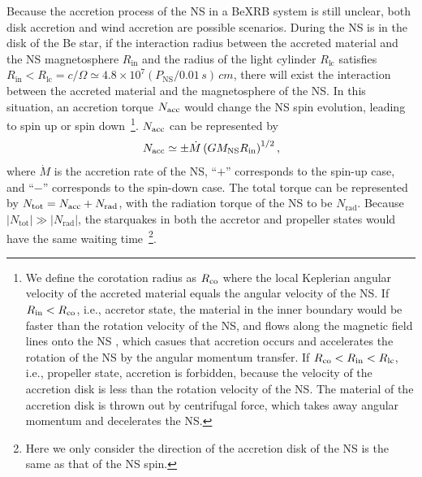 \documentclass[twocolumn]{aastex62}
\begin{document}
Because the accretion process of the NS in a BeXRB system is still unclear, both disk accretion \citep[e.g.,][]{oka01, xuxiao19} and wind accretion \citep[e.g.,][]{ikh07, sha12} are possible scenarios. 
During the NS is in the disk of the Be star, if the interaction radius between the accreted material and the NS magnetosphere $R_{\mathrm{in}}$ and the radius of the light cylinder $R_{\text{lc}}$ satisfies $R_{\mathrm{in}} < R_{\text{lc}}=c/\Omega  \simeq 4.8 \times 10^7 ( P_{\text{NS}}/0.01\,\unit{s})\,\unit{cm}$, there will exist the interaction between the accreted material and the magnetosphere of the NS. In this situation, an accretion torque $N_{\rm acc}$ would change the NS spin evolution, leading to spin up or spin down~\footnote{We define the corotation radius as $R_{\rm co}$  where the local Keplerian angular velocity of the accreted material equals the angular velocity of the NS.  
If $R_{\rm in} < R_{\rm co}$, i.e., accretor state, the material in the inner boundary would be faster than the rotation velocity of the NS, and flows along the magnetic field lines onto the NS \citep{fra02}, which casues that accretion occurs and accelerates the rotation of the NS by the angular momentum transfer. 
If $R_{\rm co} < R_{\rm in} < R_{\rm lc}$, i.e., propeller state, accretion is forbidden,  because the velocity of the accretion disk is less than the rotation velocity of the NS. The material of the accretion disk is thrown out by centrifugal force, which takes away angular momentum and decelerates the NS.}. 
$N_{\rm acc}$ can be represented by \citep[e.g.,][]{gho79b, lv12}
\begin{eqnarray}
N_{\rm acc} \simeq \pm\dot{M}\left(G M_{\text{NS}} R_{\mathrm{in}}\right)^{1 / 2},
\label{Nacc}
\end{eqnarray}
where $\dot{M}$ is the accretion rate of the NS, ``$+$'' corresponds to the spin-up case, and ``$-$'' corresponds to the spin-down case.
The total torque can be represented by $ N_{\text{tot}} = N_{\rm acc} + N_{\mathrm{rad}} $,
with the radiation torque of the NS to be $N_{\mathrm{rad}}$.
Because $|N_{\text{tot}}| \gg |N_{\mathrm{rad}}|$, the starquakes in both the accretor and propeller states would have the same waiting time~\footnote{Here we only consider the direction of the accretion disk of the NS is the same as that of the NS spin.}.
\end{document}

